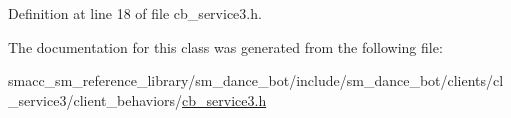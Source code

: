 Definition at line 18 of file cb\+\_\+service3.\+h.



The documentation for this class was generated from the following file\+:\begin{DoxyCompactItemize}
\item 
smacc\+\_\+sm\+\_\+reference\+\_\+library/sm\+\_\+dance\+\_\+bot/include/sm\+\_\+dance\+\_\+bot/clients/cl\+\_\+service3/client\+\_\+behaviors/\hyperlink{cb__service3_8h}{cb\+\_\+service3.\+h}\end{DoxyCompactItemize}
